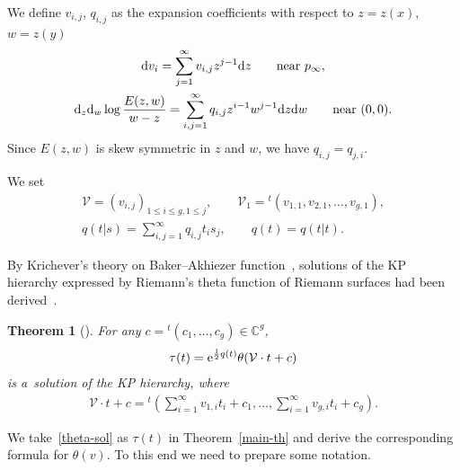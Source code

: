 \documentclass[10pt,a4paper]{amsart}
\numberwithin{equation}{section}
\newtheorem{Theorem}{Theorem}[section]
\theoremstyle{definition}
\begin{document}
We define $v_{i,j}$, $q_{i,j}$ as the expansion coefficients with respect to $z=z(x)$, $w=z(y)$
\begin{gather}
{\rm d}v_i=\sum_{j=1}^\infty v_{i,j}z^{j-1}{\rm d}z \qquad \text{near $p_\infty$},
\label{vij}
\\
{\rm d}_z{\rm d}_w\log \frac{E(z,w)}{w-z}=\sum_{i,j=1}^\infty q_{i,j} z^{i-1}w^{j-1}{\rm d}z {\rm d}w
\qquad
\text{near $(0,0)$}.
\label{qij}
\end{gather}
Since $E(z,w)$ is skew symmetric in $z$ and $w$, we have $q_{i,j}=q_{j,i}$.


We set
\begin{gather}
{\mathcal V}=(v_{i,j})_{1\leq i\leq g, 1\leq j},
\qquad
{\mathcal V}_1={}^t(v_{1,1},v_{2,1},\dots ,v_{g,1}),
\label{V1}
\\
q(t|s)=\sum_{i,j=1}^\infty q_{i,j}t_i s_j,
\qquad
q(t)=q(t|t).
\label{qts}
\end{gather}

By Krichever's theory on Baker--Akhiezer function~\cite{Krichever1977}, solutions of the KP hierarchy
expressed by Riemann's theta function of Riemann surfaces had been derived~\cite{KNTY1988,Segal-Wilson1985}.

\begin{Theorem}[\cite{KNTY1988,Segal-Wilson1985}]
For any $c={}^t(c_1,\dots ,c_g) \in {\mathbb C}^g$,
\begin{gather}
\tau(t)={\rm e}^{\frac{1}{2} q(t)}\theta({\mathcal V}\cdot t+c)
\label{theta-sol}
\end{gather}
is a~solution of the KP hierarchy, where
\begin{gather*}
{\mathcal V}\cdot t+c={}^t\left(\sum_{i=1}^\infty v_{1,i}t_i+c_1,\dots ,\sum_{i=1}^\infty v_{g,i}t_i+c_g\right).
\end{gather*}
\end{Theorem}

We take~\eqref{theta-sol} as $\tau(t)$ in Theorem~\ref{main-th} and derive
the corresponding formula for $\theta(v)$.
To this end we need to prepare some notation.
\end{document}
